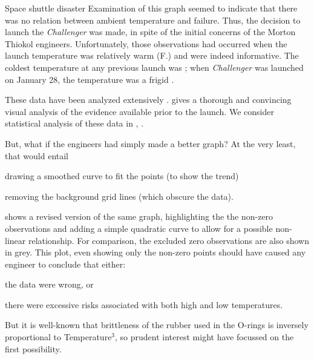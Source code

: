 \documentclass[11pt]{book}
\begin{document}
\begin{Example}[nasa]{Space shuttle disaster}
Examination of this graph seemed to indicate that there was no relation
between ambient temperature and failure.  
Thus, the decision to launch
the \emph{Challenger} was made, in spite of the initial concerns
of the Morton Thiokol engineers.
Unfortunately, those observations had occurred when the launch temperature
was relatively warm (F.) and were indeed informative.
The coldest temperature at any previous launch was ;  when \emph{Challenger} was launched on January 28,
the temperature was a frigid .

These data have been analyzed extensively
\citep{Dalal-etal:89,Lavine:91}.
\citet{Tufte:97} gives a thorough and convincing
visual analysis of the evidence available prior to the launch.
We consider statistical analysis of these data in ,
.

But, what if the engineers had simply made a better graph?
At the very least, that would entail
\begin{seriate}
\item drawing a smoothed curve to fit the points (to show the trend)
\item removing the background grid lines (which obscure the data).
\end{seriate}
shows a revised version of the same graph, highlighting the 
the non-zero observations and adding a simple quadratic
curve to allow for a possible non-linear relationship.
For comparison, the excluded zero observations are also
shown in grey.
This plot, even showing only the non-zero points
should have caused any engineer to conclude that
either: 
\begin{seriate}
\item the data were wrong, or
\item there were excessive risks
associated with both high and low temperatures.
\end{seriate}
But it is well-known
that brittleness of the rubber used in the O-rings is inversely
proportional to Temperature$^3$, so prudent interest might have focussed
on the first possibility.


\end{Example}
\end{document}
